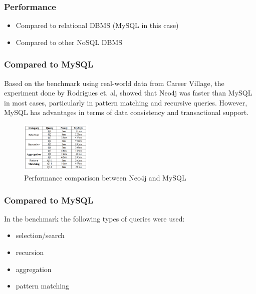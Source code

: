\documentclass[aspectratio=169]{beamer}
\begin{document}
\begin{frame}
    \frametitle{Performance}

    \begin{itemize}
        \item Compared to relational DBMS (MySQL in this case)
        \item Compared to other NoSQL DBMS
    \end{itemize}
\end{frame}

\begin{frame}
    \frametitle{Compared to MySQL}

    Based on the benchmark using real-world data from Career Village, the experiment done by
    Rodrigues et. al, showed that Neo4j was faster than MySQL in most cases, particularly in
    pattern matching and recursive queries. However, MySQL has advantages in terms of data consistency
    and transactional support. 

    \begin{figure}
        \centering
        \includegraphics[width=0.3\textwidth]{bench1.png}
        \caption{Performance comparison between Neo4j and MySQL }
        \label{fig:mysqlbench}
    \end{figure}
\end{frame}

\begin{frame}
    \frametitle{Compared to MySQL}
    In the benchmark the following types of queries were used:
    \begin{itemize}
        \item selection/search
        \item recursion
        \item aggregation
        \item pattern matching
    \end{itemize}
\end{frame}
\end{document}
